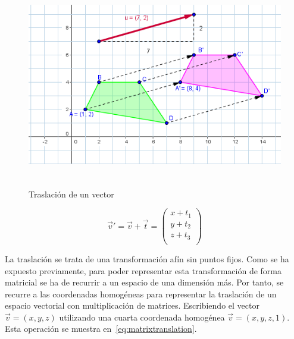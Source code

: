 \begin{figure}
	\centering	
	\includegraphics[height=9cm]{figures/traslacion.png}
	\caption{Traslación de un vector}
	\label{fig:traslation}
\end{figure}

\begin{equation}
	\label{eq:translation}
	\overrightarrow{v}' = \overrightarrow{v} + \overrightarrow{t} = 
	\left( \begin{array}{c}
			x + t_1 \\
			y + t_2 \\
			z + t_3 \\
	\end{array} \right)
\end{equation}

La traslación se trata de una transformación afín sin puntos fijos. Como se ha
expuesto previamente, para poder representar esta transformación de forma
matricial se ha de recurrir a un espacio de una dimensión más. Por tanto, se
recurre a las coordenadas homogéneas para representar la traslación de un
espacio vectorial con multiplicación de matrices. Escribiendo el vector
$\overrightarrow{v} = (x,y,z)$ utilizando una cuarta coordenada homogénea
$\overrightarrow{v} = (x,y,z,1)$. Esta operación se muestra
en~\eqref{eq:matrixtranslation}. 

